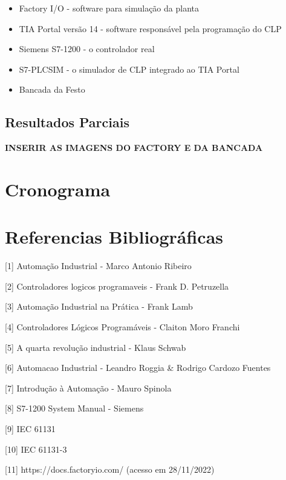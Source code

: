 \documentclass[a4paper, 12pt]{article}
\begin{document}
	\begin{itemize}
		\item Factory I/O - software para simulação da planta
		\item TIA Portal versão 14 - software responsável pela programação do CLP
		\item Siemens S7-1200 - o controlador real
		\item S7-PLCSIM - o simulador de CLP integrado ao TIA Portal
		\item Bancada da Festo
	\end{itemize}

	\subsection{Resultados Parciais}
	
	\textbf{INSERIR AS IMAGENS DO FACTORY E DA BANCADA}

\section{Cronograma}

\section{Referencias Bibliográficas}

[1] Automação Industrial - Marco Antonio Ribeiro

[2] Controladores logicos programaveis - Frank D. Petruzella

[3] Automação Industrial na Prática - Frank Lamb

[4] Controladores Lógicos Programáveis - Claiton Moro Franchi

[5] A quarta revolução industrial - Klaus Schwab

[6] Automacao Industrial - Leandro Roggia \& Rodrigo Cardozo Fuentes

[7] Introdução à Automação - Mauro Spinola

[8] S7-1200 System Manual - Siemens

[9] IEC 61131

[10] IEC 61131-3

[11] https://docs.factoryio.com/ (acesso em 28/11/2022)
\end{document}
